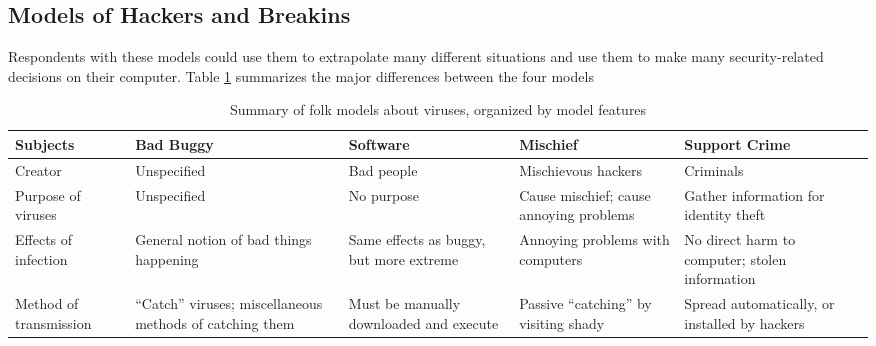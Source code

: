 \documentclass[preprint]{oscmjournal}
\begin{document}
\subsection{Models of Hackers and Breakins}
Respondents with these models could use them to extrapolate many different situations and use them to make many security-related decisions on their computer. Table \ref{table1:data} summarizes the major differences between the four models  \\
\newpage
\begin{table}[ht]
\centering
\begin{tabular}{p{2cm}|p{2cm}|p{2cm}|p{2cm}|p{2cm}}
     \hline
     Subjects & Bad Buggy & Software & Mischief & Support Crime \\
     \hline
     Creator & Unspecified & Bad  people  & Mischievous hackers  & Criminals \\
     \hline
     Purpose of viruses & Unspecified & No purpose & Cause mischief; cause annoying problems & Gather information for identity theft\\
     \hline
     Effects of infection  & General notion of bad things happening & Same effects as buggy, but more extreme & Annoying problems with computers & No direct harm to computer; stolen information\\ 
     \hline
     Method of transmission & “Catch” viruses; miscellaneous methods of catching them &
     Must be manually downloaded and execute &
     Passive “catching” by visiting shady  &
     Spread automatically, or installed by hackers \\
     \hline
\end{tabular}
\caption{Summary of folk models about viruses, organized by model features}
\label{table1:data}
\end{table}
\end{document}
